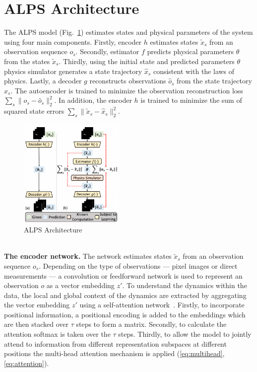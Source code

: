 \documentclass[acmtog]{techreportacmart}
\begin{document}
\section{ALPS Architecture}
The ALPS model (Fig.~\ref{fig:architecture}) estimates states and physical parameters of the system using four main components. Firstly, encoder ${h}$ estimates states $\tilde{x}_{s}$ from an observation sequence ${o_s}$. Secondly, estimator ${f}$ predicts physical parameters ${\theta}$  from the states $\tilde{x}_{s}$. Thirdly, using the initial state and predicted parameters ${\theta}$ physics simulator generates a state trajectory $\hat{x}_{s}$ consistent with the laws of physics. Lastly, a decoder ${g}$ reconstructs observations $\hat{o}_{s}$ from the state trajectory $\hat{x}_{s}$. The autoencoder is trained to minimize the observation reconstruction loss $\sum_{s} \lVert o_{s} - \hat{o}_{s} \rVert_{2}^{2}$. In addition, the encoder ${h}$ is trained to minimize the sum of squared state errors $\sum_{s} \lVert \tilde{x}_{s} - \hat{x}_{s} \rVert_{2}^{2}$.
\begin{figure}
  \centering
  \includegraphics[width=0.45\textwidth]{architecture}
  \caption{ALPS Architecture}
  \label{fig:architecture}
\end{figure}
\\
\textbf{The encoder network.} The network estimates states $\tilde{x}_{s}$ from an observation sequence ${o_s}$. Depending on the type of observations --- pixel images or direct measurements --- a convolution or feedforward network is used to represent an observation ${o}$ as a vector embedding ${z'}$. To understand the dynamics within the data, the local and global context of the dynamics are extracted by aggregating the vector embedding ${z'}$ using a self-attention network~\cite{NIPS2017_3f5ee243}. Firstly, to incorporate positional information, a positional encoding is added to the embeddings which are then stacked over ${\tau}$ steps to form a matrix. Secondly, to calculate the attention softmax is taken over the ${\tau}$ steps. Thirdly, to allow the model to jointly attend to information from different representation subspaces at different positions the multi-head attention mechanism is applied (\ref{eq:multihead},\ref{eq:attention}).
\end{document}
